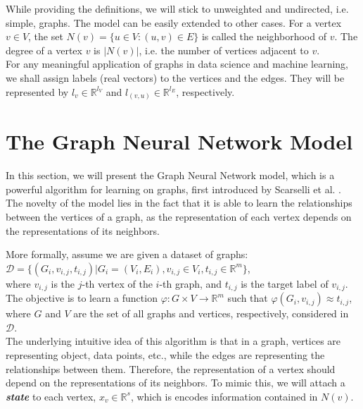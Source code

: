\documentclass[12pt]{article}
\begin{document}
    While providing the definitions, we will stick to unweighted and undirected, i.e.
    simple,  graphs.  The model can be easily extended to other cases.
    For a vertex $v \in V$, the set $N(v) = \{u \in V : (u, v) \in E\}$ is called the
    neighborhood  of  $v$. The  degree  of  a  vertex  $v$  is  $|N(v)|$,  i.e. the
    number  of  vertices  adjacent  to  $v$.
    \\

    For any meaningful application of graphs in data science and machine learning, we
    shall assign labels (real vectors) to the vertices and the edges. They will be represented by
    $l_v \in \mathbb{R}^{l_V}$ and $l_{(v, u)} \in \mathbb{R}^{l_E}$, respectively.

    

\section{The Graph Neural Network Model}
    \indent 
    In this section, we will present the Graph Neural Network model, which is a
    powerful algorithm for learning on graphs, first introduced by Scarselli et al.
    \cite{scarselli2009graph}. 
    \\
    \indent The novelty of the model lies in the fact that it is able to learn the relationships
    between the vertices of a graph, as the representation of each vertex depends on the
    representations of its neighbors.

    More formally, assume we are given a dataset of graphs: \\ $\mathcal{D} = \{(G_i, v_{i, j}, t_{i, j}) | G_i = (V_i, E_i), v_{i, j} \in V_i, t_{i, j} \in \mathbb{R}^m\}$, \\
    where $v_{i, j}$ is the $j$-th vertex of the $i$-th graph, and $t_{i, j}$ is the target label of $v_{i, j}$.
    The objective is to learn a function $\varphi : G \times V \rightarrow \mathbb{R}^m$ such that $\varphi(G_i, v_{i, j}) \approx t_{i, j}$,
    where $G$ and $V$ are the set of all graphs and vertices, respectively, considered in $\mathcal{D}$.
    \\
    \indent The underlying intuitive idea of this algorithm is that in a graph, vertices are representing object, data points, etc.,
    while the edges are representing the relationships between them. Therefore, the representation of a vertex should depend on the
    representations of its neighbors. To mimic this, we will attach a \textbf{\textit{state}} to each vertex, 
    $x_v \in \mathbb{R}^s$, which is encodes information contained in $N(v)$.
\end{document}
